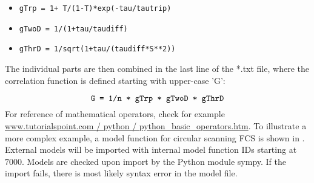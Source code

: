 \begin{itemize}
\begin{itemize}
\item \texttt{gTrp = 1+ T/(1-T)*exp(-tau/tautrip)}
\item \texttt{gTwoD = 1/(1+tau/taudiff)}
\item \texttt{gThrD = 1/sqrt(1+tau/(taudiff*S**2))}
\end{itemize}
\end{itemize}
The individual parts are then combined in the last line of the *.txt file, where the correlation function is defined starting with upper-case ’G’:

\begin{equation}
\texttt{G = 1/n * gTrp * gTwoD * gThrD} \notag
\end{equation}
For reference of mathematical operators, check for example \href{http://www.tutorialspoint.com/python/python_basic_operators.htm}{www.tutorialspoint.com / python / python\_basic\_operators.htm}. To illustrate a more complex example, a model function for circular scanning FCS is shown in . 
External models will be imported with internal model function IDs starting at $7000$. Models are checked upon import by the Python module sympy. If the import fails, there is most likely syntax error in the model file. 
